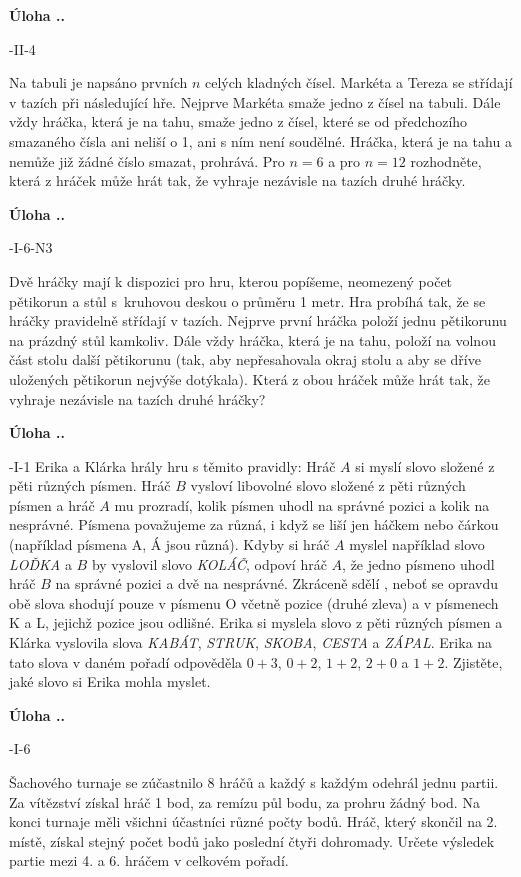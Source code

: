 \documentclass{article}
\newcounter{seminar}
\newcounter{problem}
\newcommand{\source}[1]{
  \def\temp{#1}\ifx\temp\empty
  \else
    [#1]
  \fi
}
\newcommand{\problem}[3]{
  \stepcounter{problem}
  \noindent\textbf{Úloha \theseminar .\theproblem.}
    \source{#1} #2
  \bigskip
}
\begin{document}
\problem{64-II-4}{
Na tabuli je napsáno prvních $n$ celých kladných čísel. Markéta a Tereza se střídají v tazích při následující hře. Nejprve Markéta smaže jedno z čísel na tabuli. Dále vždy hráčka, která je na tahu, smaže jedno z čísel, které se od předchozího smazaného čísla ani neliší o 1, ani s ním není soudělné. Hráčka, která je na tahu a nemůže již žádné číslo smazat, prohrává. Pro $n = 6$ a pro $n = 12$ rozhodněte, která z hráček může hrát tak, že vyhraje nezávisle na tazích druhé hráčky.
}{
}

\problem{61-I-6-N3}{
Dvě hráčky mají k dispozici pro hru, kterou popíšeme, neomezený počet pětikorun a stůl s~kruhovou deskou o průměru 1 metr. Hra probíhá tak, že se hráčky pravidelně střídají v tazích. Nejprve první hráčka položí jednu pětikorunu na prázdný stůl kamkoliv. Dále vždy hráčka, která je na tahu, položí na volnou část stolu další pětikorunu (tak, aby nepřesahovala okraj stolu a aby se dříve uložených pětikorun nejvýše dotýkala). Která z obou hráček může hrát tak, že vyhraje nezávisle na tazích druhé hráčky?
}{
}

\problem{59-I-1}{Erika a Klárka hrály hru  s těmito pravidly: Hráč $A$ si myslí slovo složené z pěti různých písmen. Hráč $B$ vysloví libovolné slovo složené z pěti různých písmen a hráč $A$ mu prozradí, kolik písmen uhodl na správné pozici a kolik na nesprávné. Písmena považujeme za různá, i když se liší jen háčkem nebo čárkou (například písmena A, Á jsou různá). Kdyby si hráč $A$ myslel například slovo \textit{LOĎKA} a $B$ by vyslovil slovo \textit{KOLÁČ}, odpoví hráč $A$, že jedno písmeno uhodl hráč $B$ na správné pozici a dvě na nesprávné. Zkráceně sdělí \uv{1 + 2}, neboť se opravdu obě slova shodují pouze v písmenu O včetně pozice (druhé zleva) a v písmenech K a L, jejichž pozice jsou odlišné. Erika si myslela slovo z pěti různých písmen a Klárka vyslovila slova \textit{KABÁT}, \textit{STRUK}, \textit{SKOBA}, \textit{CESTA} a \textit{ZÁPAL}. Erika na tato slova v daném pořadí odpověděla $0 + 3$, $0 + 2$, $1 + 2$, $2 + 0$ a $1 + 2$. Zjistěte, jaké slovo si Erika mohla myslet.
}{
}

\problem{63-I-6}{
Šachového turnaje se zúčastnilo 8 hráčů a každý s každým odehrál jednu partii. Za vítězství získal hráč 1 bod, za remízu půl bodu, za prohru žádný bod. Na konci turnaje měli všichni účastníci různé počty bodů. Hráč, který skončil na 2. místě, získal stejný počet bodů jako poslední čtyři dohromady. Určete výsledek partie mezi 4. a 6. hráčem v celkovém pořadí.
}{
}
\end{document}
